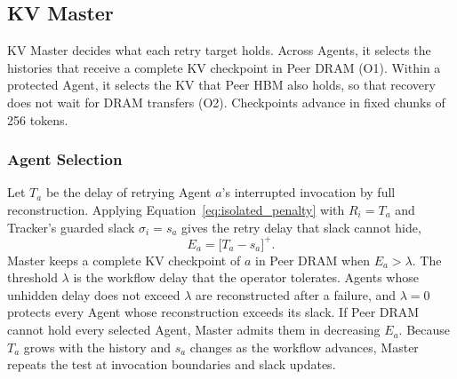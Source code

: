 \subsection{KV Master}
\label{sec:master}

KV Master decides what each retry target holds. Across Agents, it selects
the histories that receive a complete KV checkpoint in Peer DRAM (O1).
Within a protected Agent, it selects the KV that Peer HBM also holds, so
that recovery does not wait for DRAM transfers (O2). Checkpoints advance
in fixed chunks of 256 tokens.

\subsubsection{Agent Selection}
\label{sec:agent-protection}

Let $T_a$ be the delay of retrying Agent $a$'s interrupted invocation by
full reconstruction. Applying Equation~\ref{eq:isolated_penalty} with
$R_i=T_a$ and Tracker's guarded slack $\sigma_i=s_a$ gives the retry delay
that slack cannot hide,
\begin{equation}
 E_a=\bigl[T_a-s_a\bigr]^+.
 \label{eq:exposed-delay}
\end{equation}
Master keeps a complete KV checkpoint of $a$ in Peer DRAM when
$E_a>\lambda$. The threshold $\lambda$ is the workflow delay that the
operator tolerates. Agents whose unhidden delay does not exceed $\lambda$
are reconstructed after a failure, and $\lambda=0$ protects every Agent
whose reconstruction exceeds its slack. If Peer DRAM cannot hold every
selected Agent, Master admits them in decreasing $E_a$. Because $T_a$
grows with the history and $s_a$ changes as the workflow advances, Master
repeats the test at invocation boundaries and slack updates.

